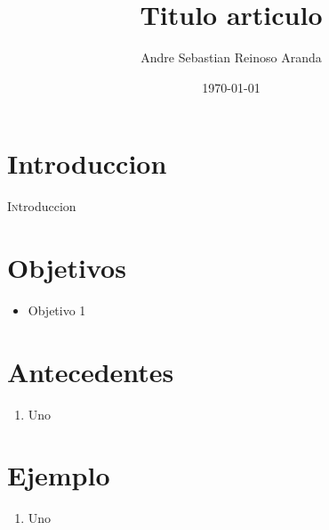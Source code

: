 \documentclass[twoside,twocolumn]{article}
\title{Titulo articulo}
\author{Andre Sebastian Reinoso Aranda\\
}
\date{\today}
\begin{document}
\maketitle


\section{Introduccion}
\lettrine[nindent=0em,lines=3]{I}ntroduccion







\section{Objetivos}

\begin{itemize}
\item Objetivo 1

\end{itemize}




\section{Antecedentes}

\begin{enumerate}

 \item Uno


\end{enumerate}




\section{Ejemplo}
\begin{enumerate}

 \item Uno
   
\end{enumerate}
\end{document}
